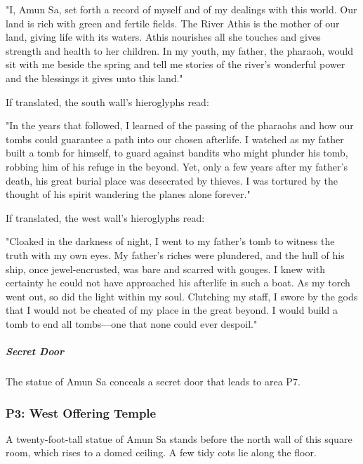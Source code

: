 \documentclass[10pt,a4paper,twoside,bg=print,twocolumn,openany,nodeprecatedcode]{dndbook}
\begin{document}
\begin{DndReadAloud}{}
"I, Amun Sa, set forth a record of myself and of my dealings with this world. Our land is rich with green and fertile fields. The River Athis is the mother of our land, giving life with its waters. Athis nourishes all she touches and gives strength and health to her children. In my youth, my father, the pharaoh, would sit with me beside the spring and tell me stories of the river's wonderful power and the blessings it gives unto this land."

\end{DndReadAloud}

If translated, the south wall's hieroglyphs read:

\begin{DndReadAloud}{}
"In the years that followed, I learned of the passing of the pharaohs and how our tombs could guarantee a path into our chosen afterlife. I watched as my father built a tomb for himself, to guard against bandits who might plunder his tomb, robbing him of his refuge in the beyond. Yet, only a few years after my father's death, his great burial place was desecrated by thieves. I was tortured by the thought of his spirit wandering the planes alone forever."

\end{DndReadAloud}

If translated, the west wall's hieroglyphs read:

\begin{DndReadAloud}{}
"Cloaked in the darkness of night, I went to my father's tomb to witness the truth with my own eyes. My father's riches were plundered, and the hull of his ship, once jewel-encrusted, was bare and scarred with gouges. I knew with certainty he could not have approached his afterlife in such a boat. As my torch went out, so did the light within my soul. Clutching my staff, I swore by the gods that I would not be cheated of my place in the great beyond. I would build a tomb to end all tombs—one that none could ever despoil."

\end{DndReadAloud}

\subparagraph{Secret Door}
The statue of Amun Sa conceals a secret door that leads to area P7.

\subsubsection{P3: West Offering Temple}
\begin{DndReadAloud}{}
A twenty-foot-tall statue of Amun Sa stands before the north wall of this square room, which rises to a domed ceiling. A few tidy cots lie along the floor.

\end{DndReadAloud}
\end{document}
